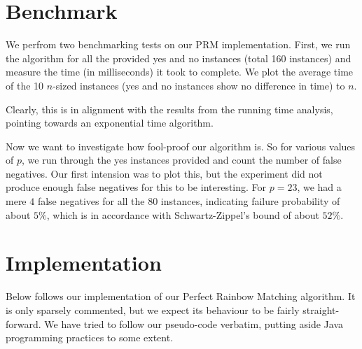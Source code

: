 \documentclass{tufte-handout}
\begin{document}
\section{Benchmark}
We perfrom two benchmarking tests on our PRM implementation. First, we run the algorithm for all the provided yes and no instances (total 160 instances) and measure the time (in milliseconds) it took to complete. We plot the average time of the 10 $n$-sized instances (yes and no instances show no difference in time) to $n$.

\vspace{6mm}

\noindent Clearly, this is in alignment with the results from the running time analysis, pointing towards an exponential time algorithm.

Now we want to investigate how fool-proof our algorithm is. So for various values of $p$, we run through the yes instances provided and count the number of false negatives. Our first intension was to plot this, but the experiment did not produce enough false negatives for this to be interesting. For $p=23$, we had a mere $4$ false negatives for all the 80 instances, indicating failure probability of about $5\%$, which is in accordance with Schwartz-Zippel's bound of about $52\%$.

\appendix

\section{Implementation}
Below follows our implementation of our Perfect Rainbow Matching algorithm. It is only sparsely commented, but we expect its behaviour to be fairly straight-forward. We have tried to follow our pseudo-code verbatim, putting aside Java programming practices to some extent.
\end{document}
